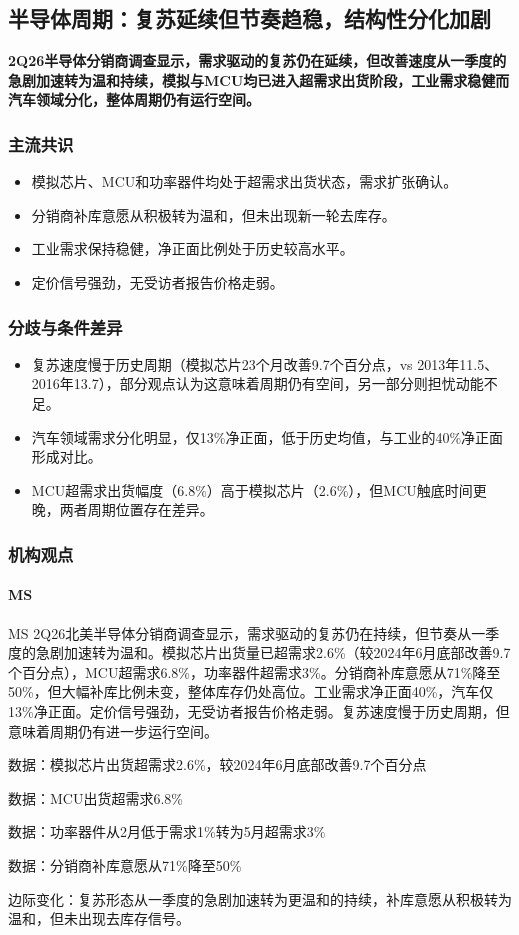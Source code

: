 \documentclass[11pt]{ctexart}
\begin{document}
\subsection{半导体周期：复苏延续但节奏趋稳，结构性分化加剧}
\textbf{2Q26半导体分销商调查显示，需求驱动的复苏仍在延续，但改善速度从一季度的急剧加速转为温和持续，模拟与MCU均已进入超需求出货阶段，工业需求稳健而汽车领域分化，整体周期仍有运行空间。}
\subsubsection*{主流共识}
\begin{itemize}
  \item 模拟芯片、MCU和功率器件均处于超需求出货状态，需求扩张确认。
  \item 分销商补库意愿从积极转为温和，但未出现新一轮去库存。
  \item 工业需求保持稳健，净正面比例处于历史较高水平。
  \item 定价信号强劲，无受访者报告价格走弱。
\end{itemize}
\subsubsection*{分歧与条件差异}
\begin{itemize}
  \item 复苏速度慢于历史周期（模拟芯片23个月改善9.7个百分点，vs 2013年11.5、2016年13.7），部分观点认为这意味着周期仍有空间，另一部分则担忧动能不足。
  \item 汽车领域需求分化明显，仅13\%净正面，低于历史均值，与工业的40\%净正面形成对比。
  \item MCU超需求出货幅度（6.8\%）高于模拟芯片（2.6\%），但MCU触底时间更晚，两者周期位置存在差异。
\end{itemize}
\subsubsection*{机构观点}
\paragraph{MS} MS 2Q26北美半导体分销商调查显示，需求驱动的复苏仍在持续，但节奏从一季度的急剧加速转为温和。模拟芯片出货量已超需求2.6\%（较2024年6月底部改善9.7个百分点），MCU超需求6.8\%，功率器件超需求3\%。分销商补库意愿从71\%降至50\%，但大幅补库比例未变，整体库存仍处高位。工业需求净正面40\%，汽车仅13\%净正面。定价信号强劲，无受访者报告价格走弱。复苏速度慢于历史周期，但意味着周期仍有进一步运行空间。
{\small\color{refgray}数据：模拟芯片出货超需求2.6\%，较2024年6月底部改善9.7个百分点\par}
{\small\color{refgray}数据：MCU出货超需求6.8\%\par}
{\small\color{refgray}数据：功率器件从2月低于需求1\%转为5月超需求3\%\par}
{\small\color{refgray}数据：分销商补库意愿从71\%降至50\%\par}
{\small\color{refgray}边际变化：复苏形态从一季度的急剧加速转为更温和的持续，补库意愿从积极转为温和，但未出现去库存信号。\par}
\end{document}
